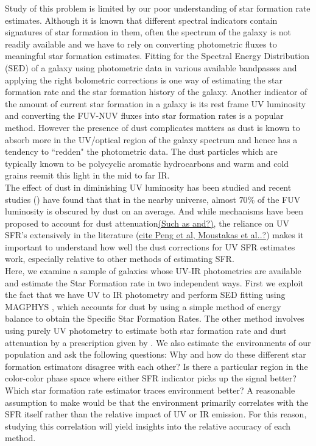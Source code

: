 \documentclass[iop]{emulateapj}
\begin{document}
Study of this problem is limited by our poor understanding of star formation rate estimates. Although it is known that different spectral indicators contain signatures of star formation in them, often the spectrum of the galaxy is not readily available and we have to rely on converting photometric fluxes to meaningful star formation estimates. Fitting for the Spectral Energy Distribution (SED) of a galaxy using photometric data in various available bandpasses and applying the right bolometric corrections is one way of estimating the star formation rate and the star formation history of the galaxy. Another indicator of the amount of current star formation in a galaxy is its rest frame UV luminosity and converting the FUV-NUV fluxes into star formation rates is a popular method. However the presence of dust complicates matters as dust is known to absorb more in the UV/optical region of the galaxy spectrum and hence has a tendency to ``redden" the photometric data. The dust particles which are typically known to be polycyclic aromatic hydrocarbons and warm and cold grains reemit this light in the mid to far IR.\\

The effect of dust in diminishing UV luminosity has been studied and recent studies (\citet{Burg13}) have found that that in the nearby universe, almost $70\%$ of the FUV luminosity is obscured by dust on an average. And while mechanisms have been proposed to account for dust attenuation\underline{(Such as \citet{Sal07} and?)}, the reliance on UV SFR's extensively in the literature (\underline{cite Peng et al, Moustakas et al..?}) makes it important to understand how well the dust corrections for UV SFR estimates work, especially relative to other methods of estimating SFR.\\

Here, we examine a sample of galaxies whose UV-IR photometries are available and estimate the Star Formation rate in two independent ways. First we exploit the fact that we have UV to IR photometry and perform SED fitting using MAGPHYS \cite[]{daC08}, which accounts for dust by using a simple method of energy balance to obtain the Specific Star Formation Rates. The other method involves using purely UV photometry to estimate both star formation rate and dust attenuation by a prescription given by \citet{Sal07}. We also estimate the environments of our population and ask the following questions: Why and how do these different star formation estimators disagree with each other? Is there a particular region in the color-color phase space where either SFR indicator picks up the signal better? Which star formation rate estimator traces environment better? A reasonable assumption to make would be that the environment primarily correlates with the SFR itself rather than the relative impact of UV or IR emission. For this reason, studying this correlation will yield insights into the relative accuracy of each method.
\end{document}
